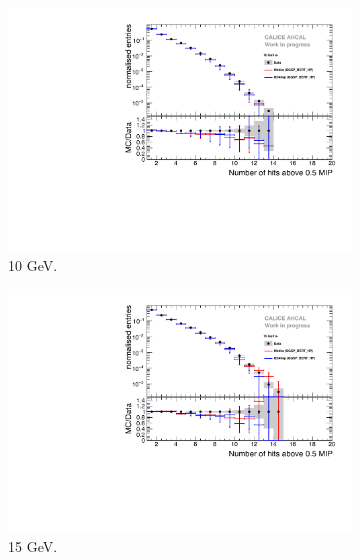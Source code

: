 \begin{figure}[t]
	\begin{subfigure}[t]{0.45\textwidth}
		\centering
		\includegraphics[width=1\textwidth]{chap5/fig_AHCAL_timing/Electrons/Comparison_SimData_Electrons_nHits_10GeV.pdf}
		\caption{10 GeV.}\label{fig:elec_sim_data_nHits_10GeV}
	\end{subfigure}
	\hfill
	\begin{subfigure}[t]{0.45\textwidth}
		\centering
		\includegraphics[width=1\textwidth]{chap5/fig_AHCAL_timing/Electrons/Comparison_SimData_Electrons_nHits_15GeV.pdf}
		\caption{15 GeV.}\label{fig:elec_sim_data_nHits_15GeV}
	\end{subfigure}
	\hfill
	\begin{subfigure}[t]{0.45\textwidth}
		\centering

\end{subfigure}
\end{figure}
